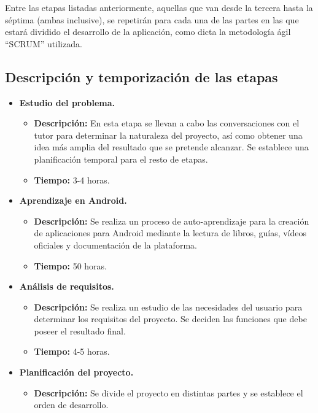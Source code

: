 Entre las etapas listadas anteriormente, aquellas que van desde la tercera hasta la séptima (ambas inclusive), se repetirán para cada una de las partes en las que estará dividido el desarrollo de la aplicación, como dicta la metodología ágil ``SCRUM'' utilizada.

\subsection{Descripción y temporización de las etapas}
\begin{itemize}
    \item \textbf{Estudio del problema.}
        \begin{itemize}
            \item \textbf{Descripción:} En esta etapa se llevan a cabo las conversaciones con el tutor para determinar la naturaleza del proyecto, así como obtener una idea más amplia del resultado que se pretende alcanzar. Se establece una planificación temporal para el resto de etapas.
            \item \textbf{Tiempo:} 3-4 horas.
        \end{itemize}
    \item \textbf{Aprendizaje en Android.}
        \begin{itemize}
            \item \textbf{Descripción:} Se realiza un proceso de auto-aprendizaje para la creación de aplicaciones para Android mediante la lectura de libros, guías, vídeos oficiales y documentación de la plataforma.
            \item \textbf{Tiempo:} 50 horas.
        \end{itemize}
    \item \textbf{Análisis de requisitos.}
        \begin{itemize}
            \item \textbf{Descripción:} Se realiza un estudio de las necesidades del usuario para determinar los requisitos del proyecto\cite{analisis_requisitos}. Se deciden las funciones que debe poseer el resultado final.
            \item \textbf{Tiempo:} 4-5 horas.
        \end{itemize}
    \item \textbf{Planificación del proyecto.}
        \begin{itemize}
            \item \textbf{Descripción:} Se divide el proyecto en distintas partes y se establece el orden de desarrollo.

\end{itemize}
\end{itemize}
